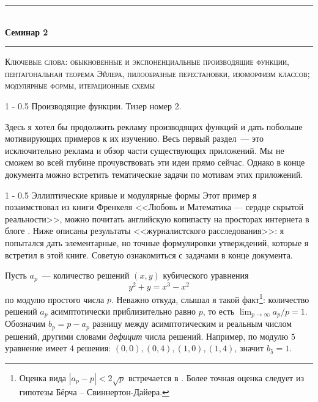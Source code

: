 \documentclass[a5paper]{article}
\makeatletter
\def \topic {Семинар 2}
\theoremstyle{definition}
\renewcommand{\section}{\@startsection
{section}%
{1}%
{\z@}%
{-\baselineskip}%
{0.5\baselineskip}%
{\centering\large\scshape}} %
\renewcommand{\subsection}{\@startsection
{subsection}%
{1}%
{\z@}%
{-\baselineskip}%
{0.5\baselineskip}%
{\centering\large\scshape}} %
\makeatother
\begin{document}
\begin{center}

\newcommand{\HRule}{\rule{\linewidth}{0.5mm}}
\HRule \\[0.2cm]
{ \Large \bfseries \topic} %
\HRule

\end{center}

\textsc{Ключевые слова: обыкновенные и экспоненциальные производящие функции, пентагональная теорема Эйлера, пилообразные перестановки, изоморфизм классов; модулярные формы, итерационные схемы}

\section{Производящие функции. Тизер номер 2.}

Здесь я хотел бы продолжить рекламу производящих функций и дать побольше 
мотивирующих примеров к их изучению. Весь первый раздел~--- это исключительно
реклама и обзор части существующих приложений. Мы не сможем во всей глубине
прочувствовать эти идеи прямо сейчас. Однако в конце документа можно встретить
тематические задачи по мотивам этих приложений.

\subsection{Эллиптические кривые и модулярные формы}
Этот пример я позаимствовал из книги Френкеля <<Любовь и Математика --- сердце
скрытой реальности>>, можно почитать английскую копипасту на просторах интернета
в блоге \cite{shimura-taniyama}. Ниже описаны результаты <<журналистского
расследования>>: я попытался дать элементарные, но точные формулировки
утверждений, которые я встретил в этой книге. Советую ознакомиться с задачами в
конце документа.

Пусть \( a_p \)~--- количество решений \( (x, y) \) кубического уравнения
\[
	y^2 + y = x^3 - x^2
\]
по модулю простого числа \( p \). Неважно откуда, слышал я такой факт\footnote{Оценка вида \( |a_p - p| < 2 \sqrt p \) встречается в \cite[Theorem 477]{number_theory}. Более точная оценка следует из гипотезы Бёрча -- Свиннертон-Дайера.}: количество решений \( a_p \) асимптотически приблизительно равно \( p \), то есть \( \lim_{p \to \infty} a_p / p = 1 \). Обозначим \( b_p = p - a_p \) разницу между асимптотическим и реальным числом решений, другими словами \textit{дефицит} числа решений. Например, по модулю \( 5 \) уравнение имеет \( 4 \) решения: \( (0,0 ), (0, 4), (1,0), (1,4) \), значит \( b_5 = 1 \).
\end{document}
